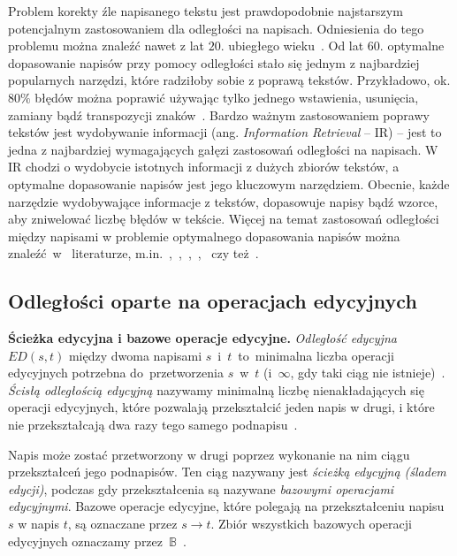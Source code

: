 \documentclass{praca1}
\begin{document}
Problem korekty źle napisanego tekstu jest prawdopodobnie najstarszym potencjalnym zastosowaniem dla odległości na napisach. Odniesienia do tego problemu można znaleźć nawet z lat $20.$ ubiegłego wieku~\cite{Masters1927:spelling}. Od lat $60.$ optymalne dopasowanie napisów przy pomocy odległości stało się jednym z najbardziej popularnych narzędzi, które radziłoby sobie z poprawą tekstów. Przykładowo, ok. $80\%$ błędów można poprawić używając tylko jednego wstawienia, usunięcia, zamiany bądź transpozycji znaków~\cite{Damerau1964:technique}. Bardzo ważnym zastosowaniem poprawy tekstów jest wydobywanie informacji (ang. \emph{Information Retrieval} -- IR) -- jest to jedna z najbardziej wymagających gałęzi zastosowań odległości na napisach. W IR chodzi o wydobycie istotnych informacji z dużych zbiorów tekstów, a optymalne dopasowanie napisów jest jego kluczowym narzędziem. Obecnie, każde narzędzie wydobywające informacje z tekstów, dopasowuje napisy bądź wzorce, aby zniwelować liczbę błędów w tekście. Więcej na temat zastosowań odległości między napisami w problemie optymalnego dopasowania napisów można znaleźć~w~ literaturze, m.in.~\cite{Boytsov2011:indexingmethods},~\cite{Navarro2001:guidedtour},~\cite{Wagner1974:stringtostring},~\cite{Wagner1975:extensionstring},~\cite{Owolabi1988:fast} czy też~\cite{Kukich1992:correcting}.

\subsection{Odległości oparte na operacjach edycyjnych}

\textbf{Ścieżka edycyjna i bazowe operacje edycyjne.} \emph{Odległość edycyjna} $ED(s,t)$ między dwoma napisami $s$~i~$t$~to~minimalna liczba operacji edycyjnych potrzebna do~przetworzenia $s$~w~$t$ (i~$\infty$, gdy taki ciąg nie istnieje)~\cite{Navarro2001:guidedtour}. \emph{Ścisłą odległością edycyjną} nazywamy minimalną liczbę nienakładających się operacji edycyjnych, które pozwalają przekształcić jeden napis w drugi, i które nie przekształcają dwa razy tego samego podnapisu~\cite{Boytsov2011:indexingmethods}.

Napis może zostać przetworzony w drugi poprzez wykonanie na nim ciągu przekształceń jego podnapisów. Ten ciąg nazywany jest \emph{ścieżką edycyjną (śladem edycji)}, podczas gdy przekształcenia są nazywane \emph{bazowymi operacjami edycyjnymi}. Bazowe operacje edycyjne, które polegają na przekształceniu napisu $s$ w napis $t$, są oznaczane przez $s \rightarrow t$. Zbiór wszystkich bazowych operacji edycyjnych oznaczamy przez~$\mathbb{B}$~\cite{Boytsov2011:indexingmethods}. 
\end{document}
